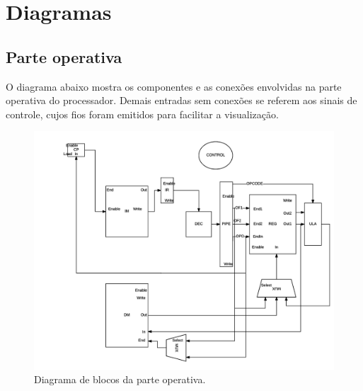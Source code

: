 \documentclass[a4paper]{article}
\begin{document}

\newpage

\section{Diagramas}

\subsection{Parte operativa}

O diagrama abaixo mostra os componentes e as conexões envolvidas na
parte operativa do processador. Demais entradas sem conexões se referem
aos sinais de controle, cujos fios foram emitidos para facilitar
a visualização.

\begin{figure}[H]
	\centering
	\includegraphics[scale=0.5]{img/procdiag}
	\caption{Diagrama de blocos da parte operativa.}
	\label{fig:op}
\end{figure}
\end{document}
